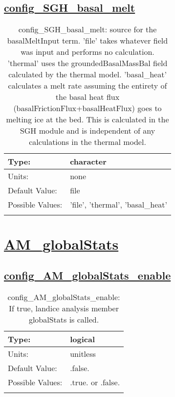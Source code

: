 \subsection[config\_SGH\_basal\_melt]{\hyperref[sec:nm_tab_subglacial_hydro]{config\_SGH\_basal\_melt}}
\label{subsec:nm_sec_config_SGH_basal_melt}
\begin{center}
\begin{longtable}{| p{2.0in} || p{4.0in} |}
    \hline
    Type: & character \\
    \hline
    Units: & \si{none} \\
    \hline
    Default Value: & file \\
    \hline
    Possible Values: & 'file', 'thermal', 'basal\_heat' \\
    \hline
    \caption{config\_SGH\_basal\_melt: source for the basalMeltInput term.  'file' takes whatever field was input and performs no calculation.  'thermal' uses the groundedBasalMassBal field calculated by the thermal model.  'basal\_heat' calculates a melt rate assuming the entirety of the basal heat flux (basalFrictionFlux+basalHeatFlux) goes to melting ice at the bed.  This is calculated in the SGH module and is independent of any calculations in the thermal model.}
\end{longtable}
\end{center}
\section[AM\_globalStats]{\hyperref[sec:nm_tab_AM_globalStats]{AM\_globalStats}}
\label{sec:nm_sec_AM_globalStats}
\subsection[config\_AM\_globalStats\_enable]{\hyperref[sec:nm_tab_AM_globalStats]{config\_AM\_globalStats\_enable}}
\label{subsec:nm_sec_config_AM_globalStats_enable}
\begin{center}
\begin{longtable}{| p{2.0in} || p{4.0in} |}
    \hline
    Type: & logical \\
    \hline
    Units: & \si{unitless} \\
    \hline
    Default Value: & .false. \\
    \hline
    Possible Values: & .true. or .false. \\
    \hline
    \caption{config\_AM\_globalStats\_enable: If true, landice analysis member globalStats is called.}
\end{longtable}
\end{center}
